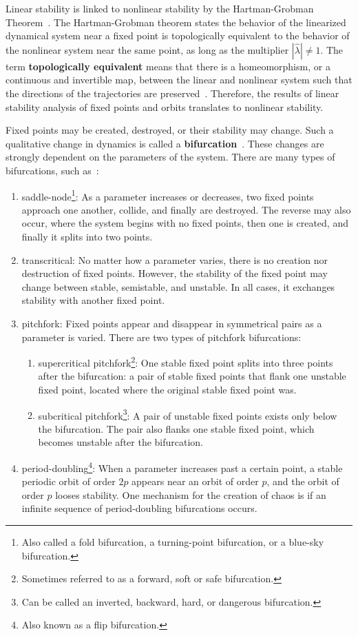 Linear stability is
linked to nonlinear stability by the Hartman-Grobman
Theorem~\cite{meiss}. The Hartman-Grobman theorem states the behavior of the linearized
dynamical system near a fixed point is topologically equivalent to the
behavior of the nonlinear system near the same point, as long as the
multiplier $|\hat{\lambda}|\neq 1$. The term \textbf{topologically
  equivalent} means that there is a homeomorphism, or a continuous and
invertible map, between the linear and nonlinear system such that the
directions of the trajectories are preserved~\cite{strogatz}. Therefore, the results of linear stability
analysis of fixed points and orbits translates to nonlinear stability. 

Fixed points may be created, destroyed, or their stability may
change. Such a qualitative change in dynamics is called a \textbf{bifurcation}~\cite{strogatz}. These changes are strongly dependent on the
parameters of the system. There are many types of
bifurcations, such as~\cite{strogatz}: 
\begin{enumerate}
\item saddle-node\footnote{Also called a fold bifurcation, a
    turning-point bifurcation, or a blue-sky bifurcation.}: As a parameter increases or decreases, two fixed
  points approach one another, collide, and finally are destroyed. The
  reverse may also occur, where the system begins with no fixed
  points, then one is created, and finally it splits into two points. 
\item transcritical: No matter how a parameter varies, there is no
  creation nor destruction of fixed points. However, the stability of
  the fixed point may change between stable, semistable, and unstable. In all cases, it
  exchanges stability with another fixed point. 
\item pitchfork: Fixed points appear and disappear in
  symmetrical pairs as a parameter is varied. There are two types of
  pitchfork bifurcations:
\begin{enumerate} 
\item supercritical pitchfork\footnote{Sometimes referred to as a
    forward, soft or safe bifurcation.}: One stable fixed point splits into
  three points after the bifurcation: a pair
  of stable fixed points that flank one unstable fixed point, located
  where the original stable fixed point was. 
\item subcritical pitchfork\footnote{Can be called an inverted,
    backward, hard, or dangerous bifurcation.}: A pair of unstable fixed points exists only below
  the bifurcation. The pair also flanks one stable fixed point, which
  becomes unstable after the bifurcation.
\end{enumerate}
\item period-doubling\footnote{Also known as a flip bifurcation.}:
  When a parameter increases past a certain point, a stable periodic orbit of
  order $2p$ appears near an orbit of order $p$, and the orbit of
  order $p$ looses stability. One mechanism for the creation of chaos is if
  an infinite sequence of period-doubling bifurcations occurs. 
\end{enumerate}
